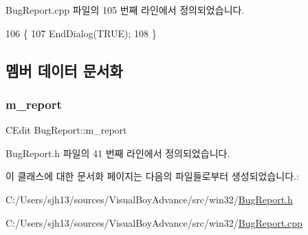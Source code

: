 Bug\+Report.\+cpp 파일의 105 번째 라인에서 정의되었습니다.


\begin{DoxyCode}
106 \{
107   EndDialog(TRUE);
108 \}
\end{DoxyCode}


\subsection{멤버 데이터 문서화}
\mbox{\label{class_bug_report_aef6dd887fcfe40d98d0fa1c6cf2d2466}} 
\subsubsection{\texorpdfstring{m\+\_\+report}{m\_report}}
{\footnotesize\ttfamily C\+Edit Bug\+Report\+::m\+\_\+report}



Bug\+Report.\+h 파일의 41 번째 라인에서 정의되었습니다.



이 클래스에 대한 문서화 페이지는 다음의 파일들로부터 생성되었습니다.\+:\begin{DoxyCompactItemize}
\item 
C\+:/\+Users/sjh13/sources/\+Visual\+Boy\+Advance/src/win32/\mbox{\hyperlink{_bug_report_8h}{Bug\+Report.\+h}}\item 
C\+:/\+Users/sjh13/sources/\+Visual\+Boy\+Advance/src/win32/\mbox{\hyperlink{_bug_report_8cpp}{Bug\+Report.\+cpp}}\end{DoxyCompactItemize}
